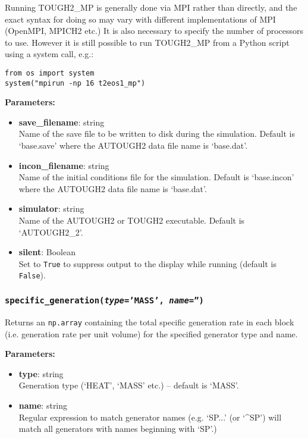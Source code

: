 Running TOUGH2\_MP is generally done via MPI rather than directly, and the exact syntax for doing so may vary with different implementations of MPI (OpenMPI, MPICH2 etc.)  It is also necessary to specify the number of processors to use.  However it is still possible to run TOUGH2\_MP from a Python script using a system call, e.g.:

\begin{lstlisting}
from os import system
system("mpirun -np 16 t2eos1_mp")
\end{lstlisting}

\textbf{Parameters:}
\begin{itemize}
\item \textbf{save\_filename}: string\\
  Name of the save file to be written to disk during the simulation.  Default is `base.save' where the AUTOUGH2 data file name is `base.dat'.
\item \textbf{incon\_filename}: string\\
  Name of the initial conditions file for the simulation.  Default is `base.incon' where the AUTOUGH2 data file name is `base.dat'.
\item \textbf{simulator}: string\\
  Name of the AUTOUGH2 or TOUGH2 executable.  Default is `AUTOUGH2\_2'.
\item \textbf{silent}: Boolean\\
  Set to \texttt{True} to suppress output to the display while running (default is \texttt{False}).
\end{itemize}

\begin{snugshade}
\subsubsection{\texttt{specific\_generation(\emph{type}='MASS', \emph{name}='')}}
\end{snugshade}
\label{sec:t2data:specific_generation}

Returns an \texttt{np.array} containing the total specific generation rate in each block (i.e. generation rate per unit volume) for the specified generator type and name.

\textbf{Parameters:}
\begin{itemize}
\item \textbf{type}: string\\
  Generation type (`HEAT', `MASS' etc.) -- default is `MASS'.
\item \textbf{name}: string\\
  Regular expression to match generator names (e.g. `SP...' (or `\^{}SP') will match all generators with names beginning with `SP'.)
\end{itemize}

